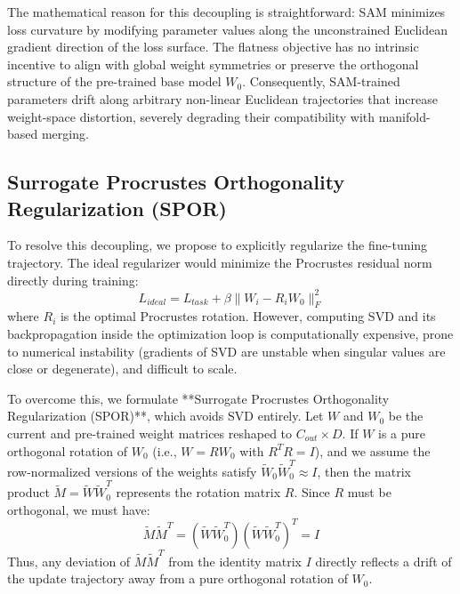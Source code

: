 \documentclass{article}
\theoremstyle{plain}
\theoremstyle{definition}
\theoremstyle{remark}
\begin{document}
The mathematical reason for this decoupling is straightforward: SAM minimizes loss curvature by modifying parameter values along the unconstrained Euclidean gradient direction of the loss surface. The flatness objective has no intrinsic incentive to align with global weight symmetries or preserve the orthogonal structure of the pre-trained base model $W_0$. Consequently, SAM-trained parameters drift along arbitrary non-linear Euclidean trajectories that increase weight-space distortion, severely degrading their compatibility with manifold-based merging.

\subsection{Surrogate Procrustes Orthogonality Regularization (SPOR)}
To resolve this decoupling, we propose to explicitly regularize the fine-tuning trajectory. The ideal regularizer would minimize the Procrustes residual norm directly during training:
\begin{equation}
    L_{ideal} = L_{task} + \beta \|W_i - R_i W_0\|_F^2
\end{equation}
where $R_i$ is the optimal Procrustes rotation. However, computing SVD and its backpropagation inside the optimization loop is computationally expensive, prone to numerical instability (gradients of SVD are unstable when singular values are close or degenerate), and difficult to scale.

To overcome this, we formulate **Surrogate Procrustes Orthogonality Regularization (SPOR)**, which avoids SVD entirely. Let $W$ and $W_0$ be the current and pre-trained weight matrices reshaped to $C_{out} \times D$. If $W$ is a pure orthogonal rotation of $W_0$ (i.e., $W = R W_0$ with $R^T R = I$), and we assume the row-normalized versions of the weights satisfy $\tilde{W}_0 \tilde{W}_0^T \approx I$, then the matrix product $\tilde{M} = \tilde{W} \tilde{W}_0^T$ represents the rotation matrix $R$. 
Since $R$ must be orthogonal, we must have:
\begin{equation}
    \tilde{M} \tilde{M}^T = (\tilde{W} \tilde{W}_0^T)(\tilde{W} \tilde{W}_0^T)^T = I
\end{equation}
Thus, any deviation of $\tilde{M} \tilde{M}^T$ from the identity matrix $I$ directly reflects a drift of the update trajectory away from a pure orthogonal rotation of $W_0$. 
\end{document}
